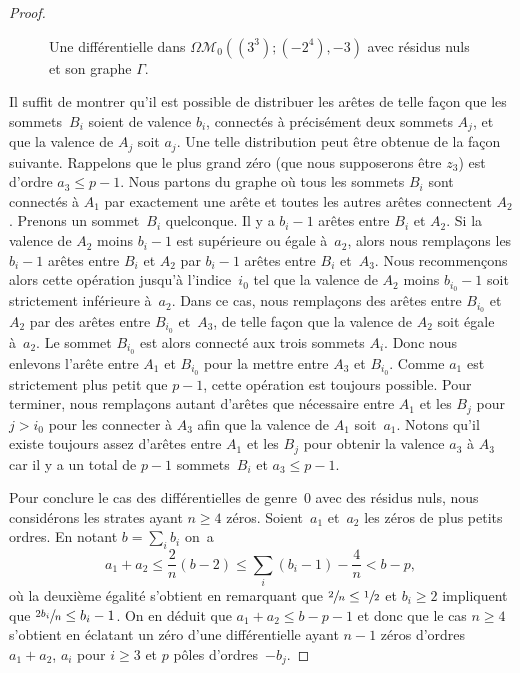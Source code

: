 \documentclass[JEP,XML,SOM,Unicode,francais,NoFloatCountersInSection,published]{cedram}
\let\mathcal\mathscr
\newcommand{\omoduli}[1][g]{{\Omega\mathcal M}_{\!#1}}
\theoremstyle{definition}
\begin{document}
\begin{proof}
\begin{figure}[htb]
\caption{Une différentielle dans $\omoduli[0]((3^3);(-2^4),-3)$ avec résidus nuls et son graphe $\Gamma$.} \label{fig:troiszerossansres}
\end{figure}

Il suffit de montrer qu'il est possible de distribuer les arêtes de telle façon que les sommets~$B_{i}$ soient de valence $b_{i}$, connectés à précisément deux sommets $A_{j}$, et que la valence de $A_{j}$ soit $a_{j}$.
Une telle distribution peut être obtenue de la façon suivante. Rappelons que le plus grand zéro (que nous supposerons être $z_{3}$) est d'ordre $a_{3}\leq p-1$. Nous partons du graphe où tous les sommets $B_{i}$ sont connectés à $A_{1}$ par exactement une arête et toutes les autres arêtes connectent $A_{2}$. Prenons un sommet~$B_{i}$ quelconque. Il y a $b_{i}-1$ arêtes entre $B_{i}$ et $A_{2}$. Si la valence de $A_{2}$ moins $b_{i}-1$ est supérieure ou égale à~$a_{2}$, alors nous remplaçons les $b_{i}-1$ arêtes entre $B_{i}$ et $A_{2}$ par $b_{i}-1$ arêtes entre $B_{i}$ et~$A_{3}$. Nous recommençons alors cette opération jusqu'à l'indice~$i_{0}$ tel que la valence de $A_{2}$ moins $b_{i_{0}}-1$ soit strictement inférieure à~$a_{2}$. Dans ce cas, nous remplaçons des arêtes entre $B_{i_{0}}$ et $A_{2}$ par des arêtes entre $B_{i_{0}}$ et~$A_{3}$, de telle façon que la valence de $A_{2}$ soit égale à~$a_{2}$. Le sommet $B_{i_{0}}$ est alors connecté aux trois sommets $A_{i}$. Donc nous enlevons l'arête entre $A_{1}$ et $B_{i_{0}}$ pour la mettre entre $A_{3}$ et $B_{i_{0}}$. Comme $a_{1}$ est strictement plus petit que $p-1$, cette opération est toujours possible. Pour terminer, nous remplaçons autant d'arêtes que nécessaire entre $A_{1}$ et les $B_{j}$ pour $j > i_{0}$ pour les connecter à $A_{3}$ afin que la valence de $A_{1}$ soit~$a_{1}$. Notons qu'il existe toujours assez d'arêtes entre $A_{1}$ et les $B_{j}$ pour obtenir la valence $a_{3}$ à $A_{3}$ car il y a un total de $p-1$ sommets~$B_{i}$ et $a_{3}\leq p-1$.

Pour conclure le cas des différentielles de genre~$0$ avec des résidus nuls, nous considérons les strates ayant $n\geq4$ zéros. Soient~$a_{1}$ et~$a_{2}$ les zéros de plus petits ordres. En notant $b=\sum_{i} b_{i}$ on~a
\begin{equation*}
a_{1}+a_{2} \leq \frac{2}{n}\left(b-2\right)\leq \sum_{i}(b_{i}-1) -\frac{4}{n} < b -p,
\end{equation*}
où la deuxième égalité s'obtient en remarquant que $\sfrac{2}{n} \leq \sfrac {1}{2}$ et $b_{i}\geq2$ impliquent que $\sfrac{2b_{i}}{n}\leq b_{i}-1$. On en déduit que $ a_{1}+a_{2} \leq b -p - 1$ et donc que le cas $n\geq 4$ s'obtient en éclatant un zéro d'une différentielle ayant $n-1$ zéros d'ordres $a_{1}+a_{2}$, $a_{i}$ pour $i\geq 3$ et $p$ pôles d'ordres~$-b_{j}$.
\end{proof}
\end{document}
